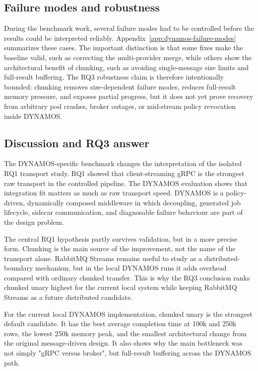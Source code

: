 \subsection{Failure modes and robustness}

During the benchmark work, several failure modes had to be controlled before the results could be interpreted reliably. Appendix~\ref{app:dynamos-failure-modes} summarizes these cases. The important distinction is that some fixes make the baseline valid, such as correcting the multi-provider merge, while others show the architectural benefit of chunking, such as avoiding single-message size limits and full-result buffering. The RQ3 robustness claim is therefore intentionally bounded: chunking removes size-dependent failure modes, reduces full-result memory pressure, and exposes partial progress, but it does not yet prove recovery from arbitrary pod crashes, broker outages, or mid-stream policy revocation inside DYNAMOS.

\subsection{Discussion and RQ3 answer}

The DYNAMOS-specific benchmark changes the interpretation of the isolated RQ1 transport study. RQ1 showed that client-streaming gRPC is the strongest raw transport in the controlled pipeline. The DYNAMOS evaluation shows that integration fit matters as much as raw transport speed. DYNAMOS is a policy-driven, dynamically composed middleware in which decoupling, generated job lifecycle, sidecar communication, and diagnosable failure behaviour are part of the design problem.

The central RQ1 hypothesis partly survives validation, but in a more precise form. Chunking is the main source of the improvement, not the name of the transport alone. RabbitMQ Streams remains useful to study as a distributed-boundary mechanism, but in the local DYNAMOS runs it adds overhead compared with ordinary chunked transfer. This is why the RQ3 conclusion ranks chunked unary highest for the current local system while keeping RabbitMQ Streams as a future distributed candidate.

For the current local DYNAMOS implementation, chunked unary is the strongest default candidate. It has the best average completion time at 100k and 250k rows, the lowest 250k memory peak, and the smallest architectural change from the original message-driven design. It also shows why the main bottleneck was not simply "gRPC versus broker", but full-result buffering across the DYNAMOS path.

